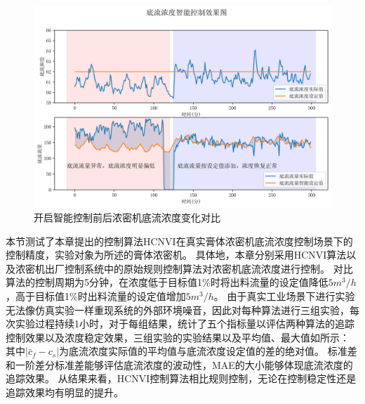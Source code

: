 \begin{figure}[htb]
  \centering
  \includegraphics[width=\linewidth,trim=0 0 0 30,clip]{figures/chapter6/actual.png}
  \caption{开启智能控制前后浓密机底流浓度变化对比}
  \label{fig:actual}
\end{figure}
本节测试了本章提出的控制算法HCNVI在真实膏体浓密机底流浓度控制场景下的控制精度，实验对象为所述的膏体浓密机。
具体地，本章分别采用HCNVI算法以及浓密机出厂控制系统中的原始规则控制算法对浓密机底流浓度进行控制。
对比算法的控制周期为5分钟，在浓度低于目标值1\%时将出料流量的设定值降低$5m^3/h$，高于目标值1\%时出料流量的设定值增加$5m^3/h$。
由于真实工业场景下进行实验无法像仿真实验一样重现系统的外部环境噪音，因此对每种算法进行三组实验，每次实验过程持续1小时，对于每组结果，统计了五个指标量以评估两种算法的追踪控制效果以及浓度稳定效果，三组实验的实验结果以及平均值、最大值如所示：
其中$|\bar{c}_{f}-{c}_{s}|$为底流浓度实际值的平均值与底流浓度设定值的差的绝对值。
标准差和一阶差分标准差能够评估底流浓度的波动性，MAE的大小能够体现底流浓度的追踪效果。
从结果来看，HCNVI控制算法相比规则控制，无论在控制稳定性还是追踪效果均有明显的提升。


